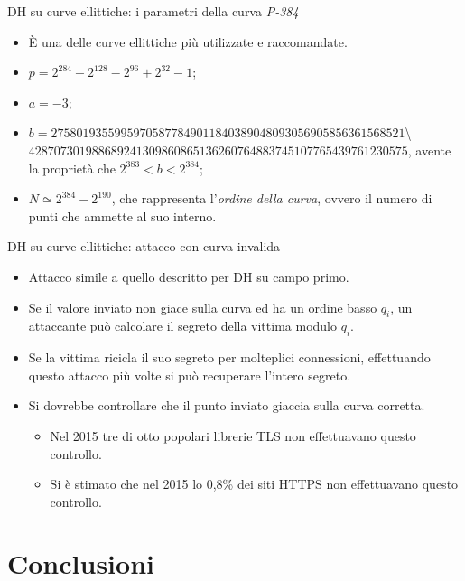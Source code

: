 \documentclass[11pt,svgnames,smaller,aspectratio=169,italian]{beamer}
\begin{document}
\begin{frame}{DH su curve ellittiche: i parametri della curva \emph{P-384}}
	\begin{itemize}
		\item È una delle curve ellittiche più utilizzate e raccomandate.
		\item $p = 2^{284} - 2^{128} - 2^{96} + 2^{32} - 1$;
		\item $a = -3$;
		\item $b =  27580193559959705877849011840389048093056905856361568521$\textbackslash \\
		$428707301988689241309860865136260764883745107765439761230575$, avente la proprietà che $2^{383} < b < 2^{384}$;
		 \item $N \simeq 2^{384} - 2^{190}$, che rappresenta l'\emph{ordine della curva}, ovvero il numero di punti che ammette al suo interno.
	\end{itemize}
\end{frame}

\begin{frame}{DH su curve ellittiche: attacco con curva invalida}
	\begin{itemize}
		\item Attacco simile a quello descritto per DH su campo primo.
		\item Se il valore inviato non giace sulla curva ed ha un ordine basso $q_{i}$, un attaccante può calcolare il segreto della vittima modulo $q_{i}$.
		\item Se la vittima ricicla il suo segreto per molteplici connessioni, effettuando questo attacco più volte si può recuperare l'intero segreto.
		\item Si dovrebbe controllare che il punto inviato giaccia sulla curva corretta.
			\begin{itemize}
				\item Nel 2015 tre di otto popolari librerie TLS non effettuavano questo controllo.
				\item Si è stimato che nel 2015 lo 0,8\% dei siti HTTPS non effettuavano questo controllo.
			\end{itemize}
	\end{itemize}
\end{frame}

\section{Conclusioni}
\begin{frame}
	\sectionpage
	\centering
\end{frame}
\end{document}
